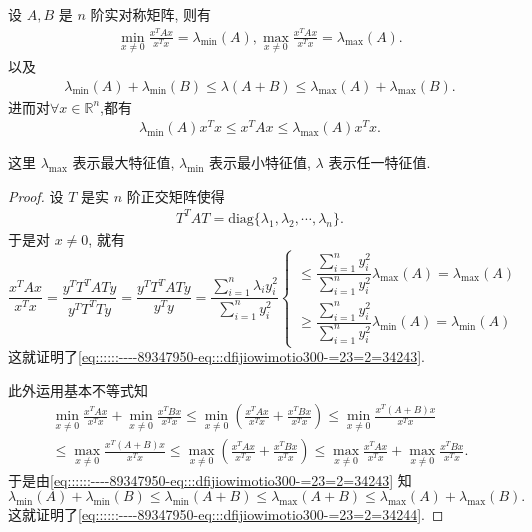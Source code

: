 \documentclass[../../main.tex]{subfiles}
\begin{document}
\begin{proposition}\label{proposition:Rayleigh-quotient瑞丽商的基本性质}
设 \( A, B \) 是 \( n \) 阶实对称矩阵, 则有
\begin{align}
\min_{x \neq 0} \frac{x^T A x}{x^T x} = \lambda_{\min}(A), \max_{x \neq 0} \frac{x^T A x}{x^T x} = \lambda_{\max}(A). \label{eq::::::----89347950-eq:::dfijiowimotio300-=23=2=34243}
\end{align}
以及
\begin{align}
\lambda_{\min}(A) + \lambda_{\min}(B) \leqslant \lambda(A + B) \leqslant \lambda_{\max}(A) + \lambda_{\max}(B). \label{eq::::::----89347950-eq:::dfijiowimotio300-=23=2=34244}
\end{align}
进而对$\forall x\in \mathbb{R}^n$,都有
\begin{align*}
\lambda_{\min}(A)x^Tx \leqslant x^TAx\leqslant \lambda_{\max}(A)x^Tx.
\end{align*}
\end{proposition}
\begin{note}
这里 \( \lambda_{\max} \) 表示最大特征值, \( \lambda_{\min} \) 表示最小特征值, \( \lambda \) 表示任一特征值.
\end{note}
\begin{proof}
设 \( T \) 是实 \( n \) 阶正交矩阵使得
\begin{align*}
T^T A T = \text{diag} \{ \lambda_1, \lambda_2, \cdots, \lambda_n \} .
\end{align*}
于是对 \( x \neq 0 \), 就有
\[
\frac{x^T A x}{x^T x} = \frac{y^T T^T A T y}{y^T T^T T y} = \frac{y^T T^T A T y}{y^T y} = \frac{\sum\limits_{i=1}^n \lambda_i y_i^2}{\sum\limits_{i=1}^n y_i^2}
\begin{cases} 
\leqslant \dfrac{\sum\limits_{i=1}^n y_i^2}{\sum\limits_{i=1}^n y_i^2} \lambda_{\max}(A)=\lambda_{\max}(A)  \\
\geqslant \dfrac{\sum\limits_{i=1}^n y_i^2}{\sum\limits_{i=1}^n y_i^2} \lambda_{\min}(A)=\lambda_{\min}(A)
\end{cases}
\]
这就证明了\eqref{eq::::::----89347950-eq:::dfijiowimotio300-=23=2=34243}.

此外运用基本不等式知
\begin{gather*}
\min_{x\ne 0} \frac{x^TAx}{x^Tx}+\min_{x\ne 0} \frac{x^TBx}{x^Tx}\leqslant \min_{x\ne 0} \left( \frac{x^TAx}{x^Tx}+\frac{x^TBx}{x^Tx} \right) \leqslant \min_{x\ne 0} \frac{x^T(A+B)x}{x^Tx}
\\
\leqslant \max_{x\ne 0} \frac{x^T(A+B)x}{x^Tx}\leqslant \max_{x\ne 0} \left( \frac{x^TAx}{x^Tx}+\frac{x^TBx}{x^Tx} \right) \leqslant \max_{x\ne 0} \frac{x^TAx}{x^Tx}+\max_{x\ne 0} \frac{x^TBx}{x^Tx}.
\end{gather*}
于是由\eqref{eq::::::----89347950-eq:::dfijiowimotio300-=23=2=34243} 知
\[
\lambda_{\min}(A) + \lambda_{\min}(B) \leqslant \lambda_{\min}(A + B) \leqslant \lambda_{\max}(A + B) \leqslant \lambda_{\max}(A) + \lambda_{\max}(B).
\]
这就证明了\eqref{eq::::::----89347950-eq:::dfijiowimotio300-=23=2=34244}.

\end{proof}
\end{document}

